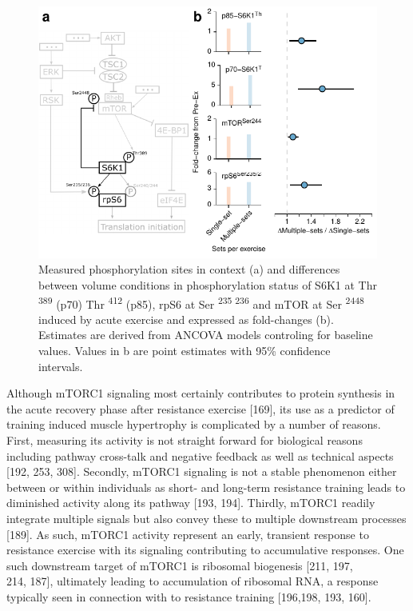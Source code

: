 \documentclass[twoside,10pt]{gihclass} %
\begin{document}
\begin{figure}

{\centering \includegraphics{thesis_files/figure-latex/mtor-fig-1} 

}

\caption[Differences between volume conditions in exercise induced phosphorylation of proteins related to mTORC1 signaling]{Measured phosphorylation sites in context (a) and differences between volume conditions in phosphorylation status of S6K1 at Thr \textsuperscript{389} (p70) Thr \textsuperscript{412} (p85), rpS6 at Ser \textsuperscript{235 236} and mTOR at Ser \textsuperscript{2448} induced by acute exercise and expressed as fold-changes (b). Estimates are derived from ANCOVA models controling for baseline values. Values in b are point estimates with 95\% confidence intervals.}\label{fig:mtor-fig}
\end{figure}
Although mTORC1 signaling most certainly contributes to protein synthesis in the acute recovery phase after resistance exercise {[}169{]},
its use as a predictor of training induced muscle hypertrophy is complicated by a number of reasons.
First, measuring its activity is not straight forward for biological reasons including pathway cross-talk and negative feedback as well as technical aspects
{[}192, 253, 308{]}.
Secondly, mTORC1 signaling is not a stable phenomenon either between or within individuals as short- and long-term resistance training leads to diminished activity along its pathway
{[}193, 194{]}.
Thirdly, mTORC1 readily integrate multiple signals but also convey these to multiple downstream processes
{[}189{]}.
As such, mTORC1 activity represent an early, transient response to resistance exercise with its signaling contributing to accumulative responses.
One such downstream target of mTORC1 is ribosomal biogenesis
{[}211, 197,\\
214, 187{]},
ultimately leading to accumulation of ribosomal RNA, a response typically seen in connection with to resistance training
{[}196,198, 193, 160{]}.
\end{document}
